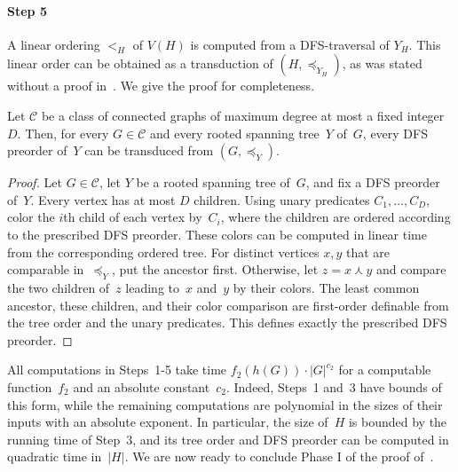 \documentclass[1p,number,11pt]{elsarticle}
\theoremstyle{plain}
\newcommand{\Cc}{\mathscr{C}}
\begin{document}
\paragraph{Step 5}

A linear ordering $<_H$ of $V(H)$ is computed from a DFS-traversal of $Y_H$.
This linear order can be obtained as a transduction of $(H,\preceq_{Y_H})$, as was stated without a proof in~\cite{buffiere2026characterizations}.
We give the proof for completeness. 

\begin{lemma}
\label{lem:bitransducible-tree-linear}
    Let $\Cc$ be a class of connected graphs of maximum degree at most a
    fixed integer~$D$.  Then, for every $G\in\Cc$ and every rooted spanning
    tree~$Y$ of~$G$, every DFS preorder of~$Y$ can be transduced from
    $(G,\preceq_Y)$.
\end{lemma}
\begin{proof}
Let $G\in\Cc$, let $Y$ be a rooted spanning tree of~$G$, and fix a DFS preorder of~$Y$.
Every vertex has at most $D$ children.
Using unary predicates $C_1,\dots,C_D$, color the $i$th child of each vertex by~$C_i$, where the children are ordered according to the prescribed DFS preorder.
These colors can be computed in linear time from the corresponding ordered tree.
For distinct vertices $x,y$ that are comparable in~$\preceq_Y$, put the ancestor first.
Otherwise, let $z=x\curlywedge y$ and compare the two children of~$z$ leading to~$x$ and~$y$ by their colors.
The least common ancestor, these children, and their color comparison are first-order definable from the tree order and the unary predicates.
This defines exactly the prescribed DFS preorder.
\end{proof}

All computations in Steps~1-5 take time $f_2(h(G))\cdot |G|^{c_2}$ for a computable function~$f_2$ and an absolute constant~$c_2$.
Indeed, Steps~1 and~3 have bounds of this form, while the remaining computations are polynomial in the sizes of their inputs with an absolute exponent.
In particular, the size of~$H$ is bounded by the running time of Step~3, and its tree order and DFS preorder can be computed in quadratic time in~$|H|$.
We are now ready to conclude Phase I of the proof of~.
\end{document}
